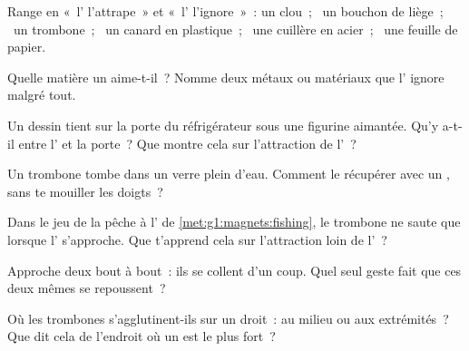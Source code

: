 \begin{exercise}[$\star$]\label{exo:g1:magnets:1}
Range en «~l' l'attrape~» et «~l' l'ignore~»~: un clou~;
\ un bouchon de liège~; \ un trombone~; \ un canard en plastique~;
\ une cuillère en acier~; \ une feuille de papier.
\end{exercise}

\begin{exercise}[$\star$]\label{exo:g1:magnets:2}
Quelle matière un  aime-t-il~? Nomme deux métaux ou matériaux
que l' ignore malgré tout.
\end{exercise}

\begin{exercise}[$\star$]\label{exo:g1:magnets:3}
Un dessin tient sur la porte du réfrigérateur sous une figurine
aimantée. Qu'y a-t-il entre l' et la porte~? Que montre cela
sur l'attraction de l'~?
\end{exercise}

\begin{exercise}[$\star$]\label{exo:g1:magnets:4}
Un trombone tombe dans un verre plein d'eau. Comment le récupérer
avec un , sans te mouiller les doigts~?
\end{exercise}

\begin{exercise}[$\star$]\label{exo:g1:magnets:5}
Dans le jeu de la pêche à l' de \cref{met:g1:magnets:fishing},
le trombone ne saute que lorsque l' s'approche. Que t'apprend
cela sur l'attraction loin de l'~?
\end{exercise}

\begin{exercise}[$\star$]\label{exo:g1:magnets:6}
Approche deux  bout à bout~: ils se collent d'un coup. Quel
seul geste fait que ces deux mêmes  se repoussent~?
\end{exercise}

\begin{exercise}[$\star$]\label{exo:g1:magnets:7}
Où les trombones s'agglutinent-ils sur un  droit~: au milieu ou
aux extrémités~? Que dit cela de l'endroit où un  est le plus
fort~?
\end{exercise}

